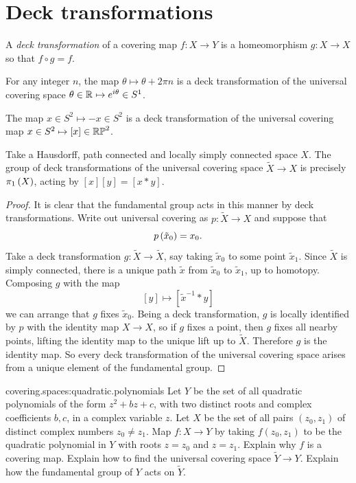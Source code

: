 \section{Deck transformations}
A \emph{deck transformation}%
of a covering map \(f \colon X \to Y\) is a homeomorphism \(g \colon X \to X\) so that \(f \circ g = f\).
\begin{example}
For any integer \(n\), the map \(\theta \mapsto \theta+2 \pi n\) is a deck transformation of the universal covering space \(\theta \in \mathbb{R}^{} \mapsto e^{i \theta} \in S^1\).
\end{example}
\begin{example}
The map \(x \in S^2 \mapsto -x \in S^2\) is a deck transformation of the universal covering map \(x \in S^2 \mapsto [x] \in \mathbb{RP}^{2}\).
\end{example} 
\begin{lemma}
Take a Hausdorff, path connected and locally simply connected space \(X\).
The group of deck transformations of the universal covering space \(\tilde{X} \to X\) is precisely \(\pi_{1}\left(X\right)\), acting by \([x][y]=[x*y]\).
\end{lemma}
\begin{proof}
It is clear that the fundamental group acts in this manner by deck transformations.
Write out universal covering as \(p \colon \tilde{X} \to X\) and suppose that 
\[
p\left(\tilde{x}_0\right)=x_0.
\]
Take a deck transformation \(g \colon \tilde{X} \to \tilde{X}\), say taking \(\tilde{x}_0\) to some point \(\tilde{x}_1\).
Since \(\tilde{X}\) is simply connected, there is a unique path \(\tilde{x}\) from \(\tilde{x}_0\) to \(\tilde{x}_1\), up to homotopy.
Composing \(g\) with the map 
\[
[y] \mapsto \left[\tilde{x}^{-1}*y\right]
\]
we can arrange that \(g\) fixes \(\tilde{x}_0\).
Being a deck transformation, \(g\) is locally identified by \(p\) with the identity map \(X \to X\), so if \(g\) fixes a point, then \(g\) fixes all nearby points, lifting the identity map to the unique lift up to \(\tilde{X}\).
Therefore \(g\) is the identity map. 
So every deck transformation of the universal covering space arises from a unique element of the fundamental group.
\end{proof}
\begin{problem}{covering.spaces:quadratic.polynomials}
Let \(Y\) be the set of all quadratic polynomials of the form \(z^2+bz+c\), with two distinct roots and complex coefficients \(b,c\), in a complex variable \(z\).
Let \(X\) be the set of all pairs \((z_0,z_1)\) of distinct complex numbers \(z_0 \ne z_1\).
Map \(f \colon X \to Y\) by taking \(f(z_0,z_1)\) to be the quadratic polynomial in \(Y\) with roots \(z=z_0\) and \(z=z_1\).
Explain why \(f\) is a covering map. 
Explain how to find the universal covering space \(\tilde{Y} \to Y\).
Explain how the fundamental group of \(Y\) acts on \(\tilde{Y}\).
\end{problem}
